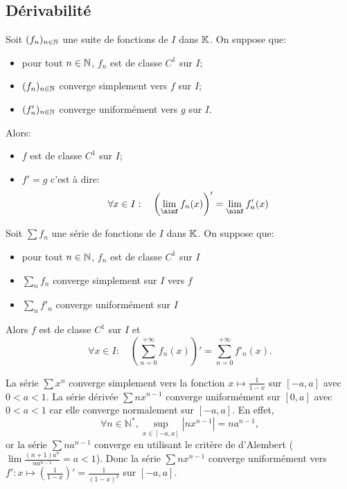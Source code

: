 \documentclass{book}
\newcommand{\fn}{(f_n)_{n\in \N   }}
\newcommand{\Sfn}{\sum f_n}
\begin{document}
\subsection{Dérivabilité}\label{sec:deriv}
%
\begin{Theoreme}
Soit $\fn$ une suite de fonctions de $I$ dans $\mathbb{K}  $.
On suppose que:
\begin{itemize}
\item
  pour tout $n\in \mathbb{N}   $, $f_n$ est de classe $C^1$ sur $I$;
\item
  $\fn$ converge simplement vers $f$ sur $I$;
\item
  $(f'_n)_{n\in\mathbb{N}}$ converge uniformément vers $g$ sur $I$.
\end{itemize}
Alors:
\begin{itemize}
\item
  $f$ est de classe $C^1$ sur $I$;
\item
  $f' = g$ c'est à dire:
$$\forall x \in I:\quad  \left(\lim_\ninf f_n(x) \right)'=\lim_\ninf f'_n(x)$$
  
  
\end{itemize}
\end{Theoreme}
\begin{Theoreme}
Soit $\Sfn$ une série de fonctions de $I$ dans $\mathbb{K}  $. On suppose que:
\begin{itemize}
\item
  pour tout $n\in \mathbb{N}   $, $f_n$ est de classe $C^1$ sur $I$
\item
  $\sum _n f_n$ converge simplement sur $I$ vers $f$
\item
  $\sum _n f'_n$ converge uniformément sur $I$
\end{itemize}

Alors $f$ est de classe $C^1$ sur $I$ et
\[ \forall  x\in I :\quad \left(\sum _{n=0}^{+\infty } f_n(x)\right)' = \sum _{n=0}^{+\infty } f'_n(x). \]
\end{Theoreme}
%
\begin{Exemple} La série $\sum x^n$ converge simplement vers la fonction $x\mapsto \frac{1}{1-x}$ sur $[-a,a]$ avec $0<a<1$.
La série dérivée $\sum n x^{n-1}$ converge uniformément sur $[0,a]$ avec $0<a<1$ car elle converge normalement sur  $[-a,a]$. En effet,
$$ \forall n\in \mathbb{N}^*, \sup_{x\in[-a,a]} |n x^{n-1}|=n a^{n-1},$$ 
or la série $\sum n a^{n-1}$ converge en utilisant le critère de d'Alembert ($\lim \frac{(n+1)a^{n}}{n a^{n-1}}=a<1$). Donc la série  $\sum n x^{n-1}$ converge uniformément vers $f':x\mapsto \left(\frac{1}{1-x}\right)'=\frac{1}{(1-x)^2}$ sur $[-a,a]$. 
\end{Exemple}
%
\end{document}
